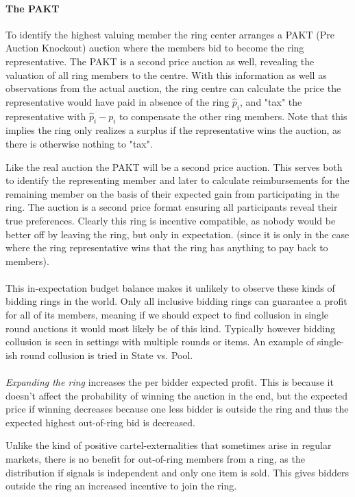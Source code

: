 \paragraph{The PAKT} 
To identify the highest valuing member the ring center arranges a PAKT (Pre Auction Knockout) auction where the members bid to become the ring representative. The PAKT is a second price auction as well, revealing the valuation of all ring members to the centre. With this information as well as observations from the actual auction, the ring centre can calculate the price the representative would have paid in absence of the ring $\hat{p}_i$, and "tax" the representative with $\hat{p}_i - p_i$ to compensate the other ring members. Note that this implies the ring only realizes a surplus if the representative wins the auction, as there is otherwise nothing to "tax".

Like the real auction the PAKT will be a second price auction. This serves both to identify the representing member and later to calculate reimbursements for the remaining member on the basis of their expected gain from participating in the ring. The auction is a second price format ensuring all participants reveal their true preferences. Clearly this ring is incentive compatible, as nobody would be better off by leaving the ring, but only in expectation. (since it is only in the case where the ring representative wins that the ring has anything to pay back to members).
\\ \\ 
This in-expectation budget balance makes it unlikely to observe these kinds of bidding rings in the world. Only all inclusive bidding rings can guarantee a profit for all of its members, meaning if we should expect to find collusion in single round auctions it would most likely be of this kind. Typically however bidding collusion is seen in settings with multiple rounds or items. 
An example of single-ish round collusion is tried in State vs. Pool.
\\ \\
\textit{Expanding the ring} increases the per bidder expected profit. This is because it doesn't affect the probability of winning the auction in the end, but the expected price if winning decreases because one less bidder is outside the ring and thus the expected highest out-of-ring bid is decreased. 

Unlike the kind of positive cartel-externalities that sometimes arise in regular markets, there is no benefit for out-of-ring members from a ring, as the distribution if signals is independent and only one item is sold. This gives bidders outside the ring an increased incentive to join the ring. 

